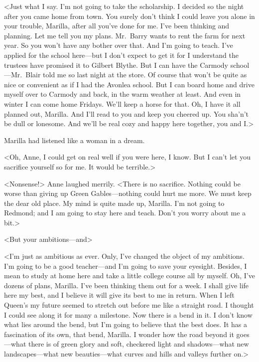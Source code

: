 <Just what I say. I'm not going to take the scholarship. I decided so the night after you came home from town. You surely don't think I could leave you alone in your trouble, Marilla, after all you've done for me. I've been thinking and planning. Let me tell you my plans. Mr.~Barry wants to rent the farm for next year. So you won't have any bother over that. And I'm going to teach. I've applied for the school here—but I don't expect to get it for I understand the trustees have promised it to Gilbert Blythe. But I can have the Carmody school—Mr.~Blair told me so last night at the store. Of course that won't be quite as nice or convenient as if I had the Avonlea school. But I can board home and drive myself over to Carmody and back, in the warm weather at least. And even in winter I can come home Fridays. We'll keep a horse for that. Oh, I have it all planned out, Marilla. And I'll read to you and keep you cheered up. You sha'n't be dull or lonesome. And we'll be real cozy and happy here together, you and I\@.>

Marilla had listened like a woman in a dream.

<Oh, Anne, I could get on real well if you were here, I know. But I can't let you sacrifice yourself so for me. It would be terrible.>

<Nonsense!> Anne laughed merrily. <There is no sacrifice. Nothing could be worse than giving up Green Gables—nothing could hurt me more. We must keep the dear old place. My mind is quite made up, Marilla. I'm not going to Redmond; and I am going to stay here and teach. Don't you worry about me a bit.>

<But your ambitions—and\longdash>

<I'm just as ambitious as ever. Only, I've changed the object of my ambitions. I'm going to be a good teacher—and I'm going to save your eyesight. Besides, I mean to study at home here and take a little college course all by myself. Oh, I've dozens of plans, Marilla. I've been thinking them out for a week. I shall give life here my best, and I believe it will give its best to me in return. When I left Queen's my future seemed to stretch out before me like a straight road. I thought I could see along it for many a milestone. Now there is a bend in it. I don't know what lies around the bend, but I'm going to believe that the best does. It has a fascination of its own, that bend, Marilla. I wonder how the road beyond it goes—what there is of green glory and soft, checkered light and shadows—what new landscapes—what new beauties—what curves and hills and valleys further on.>

